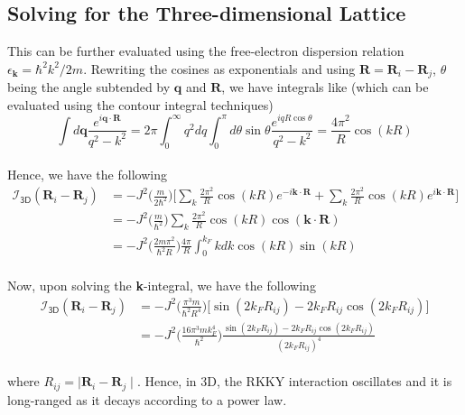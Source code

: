 \documentclass{article}
\begin{document}
\subsection{Solving for the Three-dimensional Lattice}
This can be further evaluated using the free-electron dispersion relation $\epsilon_\textbf{k} = \hbar^2 k^2 /2m$. Rewriting the cosines as exponentials and using $\textbf{R} = \textbf{R}_i - \textbf{R}_j$,  $\theta$ being the angle subtended by $\textbf{q}$ and $\textbf{R}$, we have integrals like (which can be evaluated using the contour integral techniques)
\\
\begin{equation}
\int d\textbf{q} \frac{e^{i \textbf{q} \cdot \textbf{R}}}{q^2 - k^2} = 2\pi \int_{0}^{\infty}q^2 dq \int_{0}^{\pi} d\theta \sin\theta\frac{e^{iqR \cos\theta}}{q^2 - k^2} = \frac{4\pi^2}{R} \cos(kR)
\end{equation}
\\
Hence, we have the following
\\
\begin{equation}
\begin{split}
\mathcal{I}_{\textsf{3D}}(\textbf{R}_i - \textbf{R}_j) &= -J^2 \Bigg(\frac{m}{2\hbar^2}\Bigg)\Bigg[ \sum_{k} \frac{2\pi^2}{R} \cos(kR)e^{-i\textbf{k} \cdot \textbf{R}} + \sum_{k} \frac{2\pi^2}{R} \cos(kR)e^{i\textbf{k} \cdot \textbf{R}}  \Bigg]\\
&= -J^2 \Bigg(\frac{m}{\hbar^2}\Bigg) \sum_{k} \frac{2\pi^2}{R} \cos(kR) \cos(\textbf{k} \cdot \textbf{R})\\
&=  -J^2 \Bigg(\frac{2m\pi^2}{\hbar^2 R}  \Bigg) \frac{4\pi}{R} \int_{0}^{k_F} kdk \cos(kR) \sin(kR)
\end{split}
\end{equation}
\\
Now, upon solving the \textbf{k}-integral, we have the following
\\
\begin{equation}
\begin{split}
\mathcal{I}_{\textsf{3D}}(\textbf{R}_i - \textbf{R}_j) &= -J^2 \Bigg(\frac{\pi^3m}{\hbar^2 R^4}\Bigg) \big[\sin(2k_F R_{ij}) - 2k_F R_{ij}\cos(2k_F R_{ij})\big]\\
&= -J^2 \Bigg(\frac{16\pi^3 m k_F^4}{\hbar^2}\Bigg) \frac{\sin(2k_F R_{ij}) - 2k_F R_{ij} \cos(2k_F R_{ij})}{(2k_F R_{ij})^4}
\end{split}
\end{equation}
\\
where $R_{ij} =  \mid\textbf{R}_i - \textbf{R}_j \mid$. Hence, in 3D, the RKKY interaction oscillates and it is long-ranged as it decays according to a power law.
 
\end{document}
